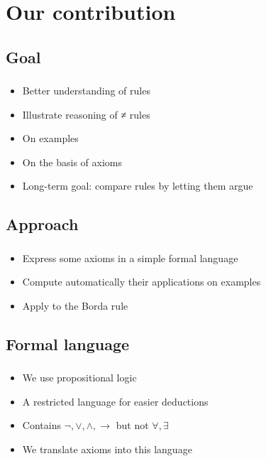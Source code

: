 \documentclass[french, english]{beamer}
\begin{document}
\section{Our contribution}
\subsection{Goal}
\begin{frame}
	\frametitle{\subsecname}
	\begin{itemize}
		\item Better understanding of rules
		\item Illustrate reasoning of ≠ rules
		\item On examples
		\item On the basis of axioms
		\item Long-term goal: compare rules by letting them argue
	\end{itemize}
\end{frame}

\subsection{Approach}
\begin{frame}
	\frametitle{\subsecname}
	\begin{itemize}
		\item Express some axioms in a simple formal language
		\item Compute automatically their applications on examples
		\item Apply to the Borda rule
	\end{itemize}
\end{frame}

\subsection{Formal language}
\begin{frame}
	\frametitle{\subsecname}
	\begin{itemize}
		\item We use propositional logic
		\item A restricted language for easier deductions
		\item Contains $¬, ∨,∧, →$ but not $\forall, \exists$
		\item We translate axioms into this language
	\end{itemize}
\end{frame}
\end{document}
